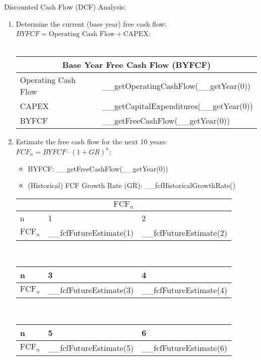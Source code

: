 Discounted Cash Flow (DCF) Analysis:
\begin{enumerate}
	\item Determine the current (base year) free cash flow: $BYFCF = \text{Operating Cash Flow} + \text{CAPEX}$:\\\\
\begin{tabularx}{\textwidth}{|X|X|}
 \hline
 \multicolumn{2}{|c|}{Base Year Free Cash Flow (BYFCF)} \\
 \hline
 Operating Cash Flow        & __getOperatingCashFlow(__getYear(0))   \\
 CAPEX                      & __getCapitalExpenditures(__getYear(0)) \\
 \rowcolor{lightgray} BYFCF & __getFreeCashFlow(__getYear(0))        \\
 \hline
\end{tabularx}
	\item Estimate the free cash flow for the next 10 years: $FCF_n = BYFCF \cdot (1+GR)^n$:
	\begin{itemize}
        \item BYFCF: __getFreeCashFlow(__getYear(0))
        \item (Historical) FCF Growth Rate (GR): __fcfHistoricalGrowthRate()
    \end{itemize}
\begin{tabularx}{\textwidth}{|X|X|X|}
 \hline
 \multicolumn{3}{|c|}{$\text{FCF}_n$} \\
 \hline
 n & 1 & 2 \\
 \hline
 \rowcolor{lightgray} $\text{FCF}_n$ & __fcfFutureEstimate(1) & __fcfFutureEstimate(2) \\
 \hline
\end{tabularx}\\

\begin{tabularx}{\textwidth}{|X|X|X|}
 \hline
 n & 3 & 4 \\
 \hline
 \rowcolor{lightgray} $\text{FCF}_n$ & __fcfFutureEstimate(3) & __fcfFutureEstimate(4) \\
 \hline
\end{tabularx}\\

\begin{tabularx}{\textwidth}{|X|X|X|}
 \hline
 n & 5 & 6 \\
 \hline
 \rowcolor{lightgray} $\text{FCF}_n$ & __fcfFutureEstimate(5) & __fcfFutureEstimate(6) \\
 \hline
\end{tabularx}\\


\end{enumerate}
